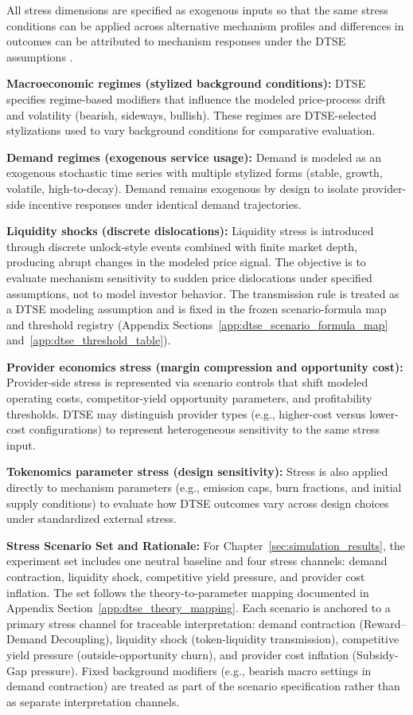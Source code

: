 All stress dimensions are specified as exogenous inputs so that the same stress conditions can be applied across alternative mechanism profiles and differences in outcomes can be attributed to mechanism responses under the DTSE assumptions \cite{Morris2019}.

\noindent\textbf{Macroeconomic regimes (stylized background conditions):}
DTSE specifies regime-based modifiers that influence the modeled price-process drift and volatility (bearish, sideways, bullish). These regimes are DTSE-selected stylizations used to vary background conditions for comparative evaluation.

\noindent\textbf{Demand regimes (exogenous service usage):}
Demand is modeled as an exogenous stochastic time series with multiple stylized forms (stable, growth, volatile, high-to-decay). Demand remains exogenous by design to isolate provider-side incentive responses under identical demand trajectories.

\noindent\textbf{Liquidity shocks (discrete dislocations):}
Liquidity stress is introduced through discrete unlock-style events combined with finite market depth, producing abrupt changes in the modeled price signal. The objective is to evaluate mechanism sensitivity to sudden price dislocations under specified assumptions, not to model investor behavior.
The transmission rule is treated as a DTSE modeling assumption and is fixed in the frozen scenario-formula map and threshold registry (Appendix Sections~\ref{app:dtse_scenario_formula_map} and~\ref{app:dtse_threshold_table}).

\noindent\textbf{Provider economics stress (margin compression and opportunity cost):}
Provider-side stress is represented via scenario controls that shift modeled operating costs, competitor-yield opportunity parameters, and profitability thresholds. DTSE may distinguish provider types (e.g., higher-cost versus lower-cost configurations) to represent heterogeneous sensitivity to the same stress input.

\noindent\textbf{Tokenomics parameter stress (design sensitivity):}
Stress is also applied directly to mechanism parameters (e.g., emission caps, burn fractions, and initial supply conditions) to evaluate how DTSE outcomes vary across design choices under standardized external stress.

\noindent\textbf{Stress Scenario Set and Rationale:}
\label{subsec:dtse_scenario_set}
For Chapter~\ref{sec:simulation_results}, the experiment set includes one neutral baseline and four stress channels: demand contraction, liquidity shock, competitive yield pressure, and provider cost inflation. The set follows the theory-to-parameter mapping documented in Appendix Section~\ref{app:dtse_theory_mapping}. Each scenario is anchored to a primary stress channel for traceable interpretation: demand contraction (Reward--Demand Decoupling), liquidity shock (token-liquidity transmission), competitive yield pressure (outside-opportunity churn), and provider cost inflation (Subsidy-Gap pressure). Fixed background modifiers (e.g., bearish macro settings in demand contraction) are treated as part of the scenario specification rather than as separate interpretation channels.

